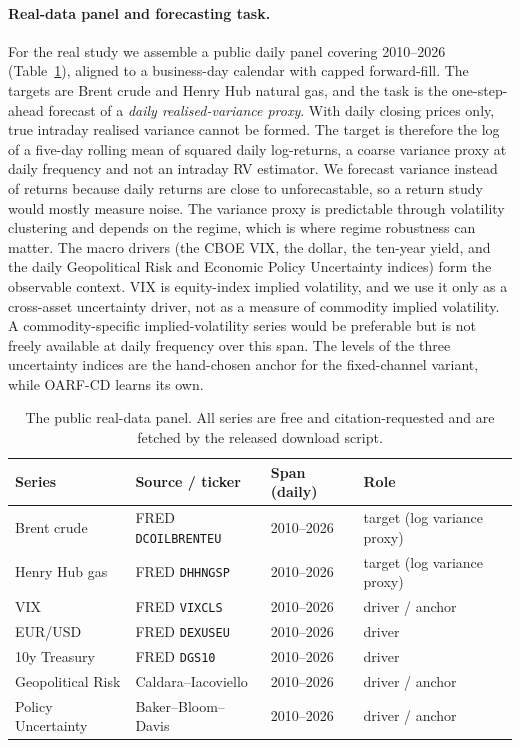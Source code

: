 \documentclass[11pt]{article}
\theoremstyle{plain}
\theoremstyle{remark}
\newcommand{\OARFCD}{\textsc{OARF-CD}}
\begin{document}
\paragraph{Real-data panel and forecasting task.}
For the real study we assemble a public daily panel covering 2010--2026
(Table~\ref{tab:realdata}), aligned to a business-day calendar with capped
forward-fill. The targets are Brent crude and Henry Hub natural gas, and the task is
the one-step-ahead forecast of a \emph{daily realised-variance proxy}. With daily
closing prices only, true intraday realised variance cannot be formed. The target is
therefore the log of a five-day rolling mean of squared daily log-returns, a coarse
variance proxy at daily frequency and not an intraday RV estimator. We forecast
variance instead of returns because daily returns are close to unforecastable, so a
return study would mostly measure noise. The variance proxy is predictable through
volatility clustering and depends on the regime, which is where regime robustness can
matter. The macro drivers (the CBOE VIX, the dollar, the ten-year yield, and the daily
Geopolitical Risk and Economic Policy Uncertainty indices) form the observable context.
VIX is equity-index implied volatility, and we use it only as a cross-asset
uncertainty driver, not as a measure of commodity implied volatility. A
commodity-specific implied-volatility series would be preferable but is not freely
available at daily frequency over this span. The levels of the three uncertainty
indices are the hand-chosen anchor for the fixed-channel variant, while \OARFCD{}
learns its own.

\begin{table}[htbp]
\centering
\caption{The public real-data panel. All series are free and citation-requested and are
fetched by the released download script.}
\label{tab:realdata}
\small
\begin{tabular}{llll}
\toprule
Series & Source / ticker & Span (daily) & Role\\
\midrule
Brent crude & FRED \texttt{DCOILBRENTEU} & 2010--2026 & target (log variance proxy)\\
Henry Hub gas & FRED \texttt{DHHNGSP} & 2010--2026 & target (log variance proxy)\\
VIX & FRED \texttt{VIXCLS} & 2010--2026 & driver / anchor\\
EUR/USD & FRED \texttt{DEXUSEU} & 2010--2026 & driver\\
10y Treasury & FRED \texttt{DGS10} & 2010--2026 & driver\\
Geopolitical Risk & Caldara--Iacoviello \citep{caldara2022gpr} & 2010--2026 & driver / anchor\\
Policy Uncertainty & Baker--Bloom--Davis \citep{baker2016epu} & 2010--2026 & driver / anchor\\
\bottomrule
\end{tabular}
\end{table}
\end{document}
